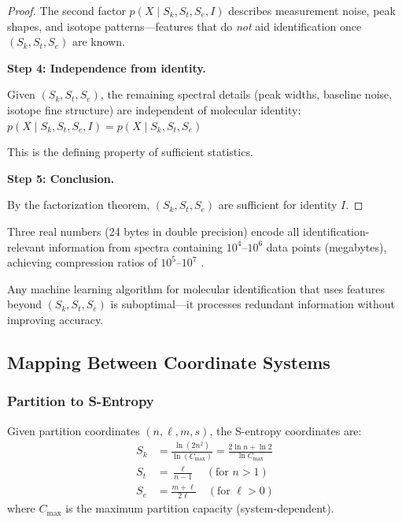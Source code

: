 \begin{proof}
The second factor $p(X \mid S_k, S_t, S_e, I)$ describes measurement noise, peak shapes, and isotope patterns—features that do \emph{not} aid identification once $(S_k, S_t, S_e)$ are known.

\textbf{Step 4: Independence from identity.}

Given $(S_k, S_t, S_e)$, the remaining spectral details (peak widths, baseline noise, isotope fine structure) are independent of molecular identity:
$
p(X \mid S_k, S_t, S_e, I) = p(X \mid S_k, S_t, S_e)
$

This is the defining property of sufficient statistics.

\textbf{Step 5: Conclusion.}

By the factorization theorem, $(S_k, S_t, S_e)$ are sufficient for identity $I$.
\end{proof}

\begin{corollary}
\label{cor:compression}
Three real numbers (24 bytes in double precision) encode all identification-relevant information from spectra containing $10^4$–$10^6$ data points (megabytes), achieving compression ratios of $10^5$–$10^7$ \citep{shannon1948mathematical,cover2006elements}.
\end{corollary}

\begin{corollary}
\label{cor:optimal}
Any machine learning algorithm for molecular identification that uses features beyond $(S_k, S_t, S_e)$ is suboptimal—it processes redundant information without improving accuracy.
\end{corollary}

\subsection{Mapping Between Coordinate Systems}

\subsubsection{Partition to S-Entropy}

Given partition coordinates $(n, \ell, m, s)$, the S-entropy coordinates are:
\begin{align}
S_k &= \frac{\ln(2n^2)}{\ln(C_{\max})} = \frac{2\ln n + \ln 2}{\ln C_{\max}} \\
S_t &= \frac{\ell}{n-1} \quad (\text{for } n > 1) \\
S_e &= \frac{m + \ell}{2\ell} \quad (\text{for } \ell > 0)
\end{align}
where $C_{\max}$ is the maximum partition capacity (system-dependent).

